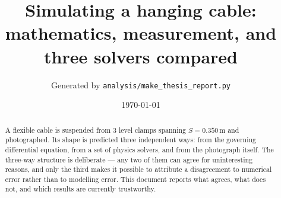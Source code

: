\documentclass[11pt,a4paper]{article}
\title{Simulating a hanging cable:\\
       mathematics, measurement, and three solvers compared}
\author{Generated by \texttt{analysis/make\_thesis\_report.py}}
\date{\today}
\begin{document}
\maketitle

\begin{abstract}
A flexible cable is suspended from 3 level clamps spanning
$S = 0.350$\,m and photographed. Its shape is predicted three independent
ways: from the governing differential equation, from a set of physics solvers,
and from the photograph itself. The three-way structure is deliberate --- any
two of them can agree for uninteresting reasons, and only the third makes it
possible to attribute a disagreement to numerical error rather than to
modelling error. This document reports what agrees, what does not, and which
results are currently trustworthy.
\end{abstract}
\end{document}

